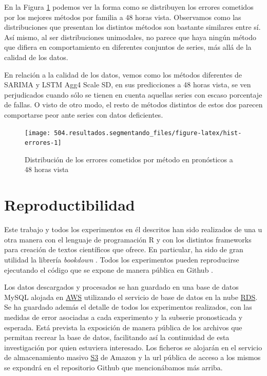 \documentclass[]{book}
\begin{document}
En la Figura \ref{fig:hist-errores} podemos ver la forma como se
distribuyen los errores cometidos por los mejores métodos por familia a
48 horas vista. Observamos como las distribuciones que presentan los
distintos métodos son bastante similares entre sí. Así mismo, al ser
distribuciones unimodales, no parece que haya ningún método que difiera
en comportamiento en diferentes conjuntos de series, más allá de la
calidad de los datos.

En relación a la calidad de los datos, vemos como los métodos diferentes
de SARIMA y LSTM Agg4 Scale SD, en sus predicciones a 48 horas vista, se
ven perjudicados cuando sólo se tienen en cuenta aquellas series con
escaso porcentaje de fallas. O visto de otro modo, el resto de métodos
distintos de estos dos parecen comportarse peor ante series con datos
deficientes.

\begin{figure}[H]

{\centering \texttt{[image: 504.resultados.segmentando\_files/figure-latex/hist-errores-1]} 

}

\caption{Distribución de los errores cometidos por método en pronósticos a 48 horas vista}\label{fig:hist-errores}
\end{figure}

\section{Reproductibilidad}\label{reproductibilidad}

Este trabajo y todos los experimentos en él descritos han sido
realizados de una u otra manera con el lenguaje de programación R y con
los distintos frameworks para creación de textos científicos que ofrece.
En particular, ha sido de gran utilidad la librería \emph{bookdown}
\citep{R-bookdown}. Todos los experimentos pueden reproducirse
ejecutando el código que se expone de manera pública en Github
\citep{amanas-github}.

Los datos descargados y procesados se han guardado en una base de datos
MySQL alojada en \href{https://aws.amazon.com/}{AWS} utilizando el
servicio de base de datos en la nube
\href{https://aws.amazon.com/es/rds/}{RDS}. Se ha guardado además el
detalle de todos los experimentos realizados, con las medidas de error
asociadas a cada experimento y la subserie pronosticada y esperada. Está
prevista la exposición de manera pública de los archivos que permitan
recrear la base de datos, facilitando así la continuidad de esta
investigación por quien estuviera interesado. Los ficheros se alojarán
en el servicio de almacenamiento masivo
\href{https://aws.amazon.com/es/s3/}{S3} de Amazon y la url pública de
acceso a los mismos se expondrá en el repositorio Github que
mencionábamos más arriba.
\end{document}
